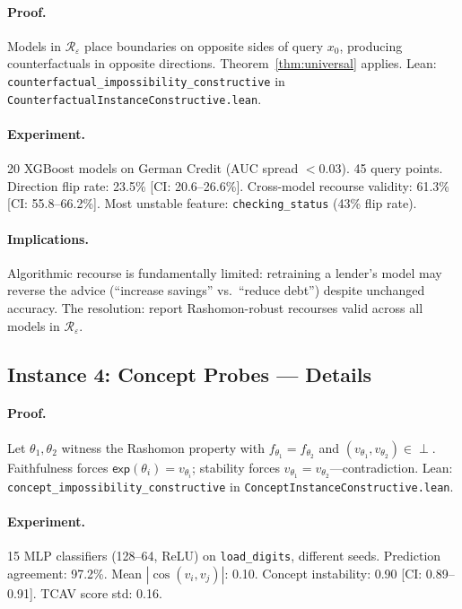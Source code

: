 \documentclass{article}
\newcommand{\incomp}{\perp}
\begin{document}
\paragraph{Proof.}
Models in $\mathcal{R}_\varepsilon$ place boundaries on opposite sides of query $x_0$, producing counterfactuals in opposite directions.  Theorem~\ref{thm:universal} applies.  Lean: \texttt{counterfactual\_impossibility\_constructive} in \texttt{CounterfactualInstanceConstructive.lean}.

\paragraph{Experiment.}
20 XGBoost models on German Credit (AUC spread $< 0.03$).  45 query points.  Direction flip rate: 23.5\% [CI: 20.6--26.6\%].  Cross-model recourse validity: 61.3\% [CI: 55.8--66.2\%].  Most unstable feature: \texttt{checking\_status} (43\% flip rate).

\paragraph{Implications.}
Algorithmic recourse is fundamentally limited: retraining a lender's model may reverse the advice (``increase savings'' vs.\ ``reduce debt'') despite unchanged accuracy.  The resolution: report Rashomon-robust recourses valid across all models in $\mathcal{R}_\varepsilon$.

\subsection{Instance 4: Concept Probes --- Details}

\paragraph{Proof.}
Let $\theta_1, \theta_2$ witness the Rashomon property with $f_{\theta_1} = f_{\theta_2}$ and $(v_{\theta_1}, v_{\theta_2}) \in \incomp$.  Faithfulness forces $\mathsf{exp}(\theta_i) = v_{\theta_i}$; stability forces $v_{\theta_1} = v_{\theta_2}$---contradiction.  Lean: \texttt{concept\_impossibility\_constructive} in \texttt{ConceptInstanceConstructive.lean}.

\paragraph{Experiment.}
15 MLP classifiers (128--64, ReLU) on \texttt{load\_digits}, different seeds.  Prediction agreement: 97.2\%.  Mean $|\cos(v_i, v_j)|$: 0.10.  Concept instability: 0.90 [CI: 0.89--0.91].  TCAV score std: 0.16.
\end{document}
